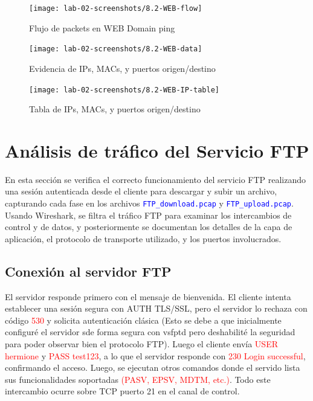 \documentclass[10pt]{article}
\begin{document}
\begin{figure}[H]
    \centering
    \texttt{[image: lab-02-screenshots/8.2-WEB-flow]}
    \caption{Flujo de packets en WEB Domain ping}
\end{figure}


\begin{figure}[H]
    \centering
    \texttt{[image: lab-02-screenshots/8.2-WEB-data]}
    \caption{Evidencia de IPs, MACs, y puertos origen/destino}
\end{figure}


\begin{figure}[H]
    \centering
    \texttt{[image: lab-02-screenshots/8.2-WEB-IP-table]}
    \caption{Tabla de IPs, MACs, y puertos origen/destino}
\end{figure}

\renewcommand{\thesection}{8.\arabic{section}}
\section{Análisis de tráfico del Servicio FTP}

En esta sección se verifica el correcto funcionamiento del servicio FTP realizando una sesión autenticada desde el cliente para descargar y subir un archivo, capturando cada fase en los archivos \textcolor{blue}{\texttt{FTP\_download.pcap}} y \textcolor{blue}{\texttt{FTP\_upload.pcap}}. Usando Wireshark, se filtra el tráfico FTP para examinar los intercambios de control y de datos, y posteriormente se documentan los detalles de la capa de aplicación, el protocolo de transporte utilizado, y los puertos involucrados. 

\subsection{Conexión al servidor FTP}
El servidor responde primero con el mensaje de bienvenida. El cliente intenta establecer una sesión segura con AUTH TLS/SSL, pero el servidor lo rechaza con código \textcolor{red}{530} y solicita autenticación clásica (Esto se debe a que inicialmente configuré el servidor sde forma segura con vsfptd pero deshabilité la seguridad para poder observar bien el protocolo FTP). Luego el cliente envía \textcolor{red}{USER hermione} y \textcolor{red}{PASS test123}, a lo que el servidor responde con \textcolor{red}{230 Login successful}, confirmando el acceso. Luego, se ejecutan otros comandos donde el servido lista sus funcionalidades soportadas \textcolor{red}{(PASV, EPSV, MDTM, etc.)}. Todo este intercambio ocurre sobre TCP puerto 21 en el canal de control.
\end{document}
